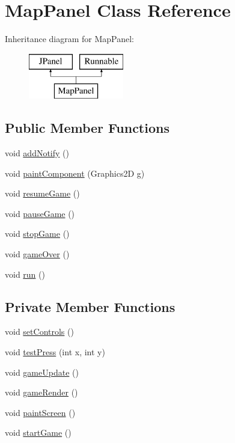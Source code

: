 \hypertarget{classMapPanel}{\section{Map\-Panel Class Reference}
\label{classMapPanel}
}
Inheritance diagram for Map\-Panel\-:\begin{figure}[H]
\begin{center}
\leavevmode
\includegraphics[height=2.000000cm]{d3/dab/classMapPanel}
\end{center}
\end{figure}
\subsection*{Public Member Functions}
\begin{DoxyCompactItemize}
\item 
void \hyperlink{classMapPanel_a7c1a269fe83ad8865f49bcb0155a4131}{add\-Notify} ()
\item 
void \hyperlink{classMapPanel_a5a1d201167de7399668e110c0f75c9be}{paint\-Component} (Graphics2\-D g)
\item 
void \hyperlink{classMapPanel_a6ae73cdac59708713354a2ba4f81aab0}{resume\-Game} ()
\item 
void \hyperlink{classMapPanel_a5efc48884233516e77d25d2e467913a6}{pause\-Game} ()
\item 
void \hyperlink{classMapPanel_a1bfb13628206b010c607a51461a5714e}{stop\-Game} ()
\item 
void \hyperlink{classMapPanel_ad3aa911c03a0e80f6a223b8f8eff43d6}{game\-Over} ()
\item 
void \hyperlink{classMapPanel_ad8cf61431c3e5928aeab0e1035fefe18}{run} ()
\end{DoxyCompactItemize}
\subsection*{Private Member Functions}
\begin{DoxyCompactItemize}
\item 
void \hyperlink{classMapPanel_add873c163ad14ab4e194ae9a897333b7}{set\-Controls} ()
\item 
void \hyperlink{classMapPanel_a51c4a598e2a1e0e385a4dd4bf4492e8e}{test\-Press} (int x, int y)
\item 
void \hyperlink{classMapPanel_a31f00f5993c4d117ba795d6ba46cb8a6}{game\-Update} ()
\item 
void \hyperlink{classMapPanel_a855596851c23f07b2a8e57e17e47cfb2}{game\-Render} ()
\item 
void \hyperlink{classMapPanel_aa04a6dded4624d9c3da9d136d35aff98}{paint\-Screen} ()
\item 
void \hyperlink{classMapPanel_ab700710546b15759204beddaddd26843}{start\-Game} ()
\end{DoxyCompactItemize}
